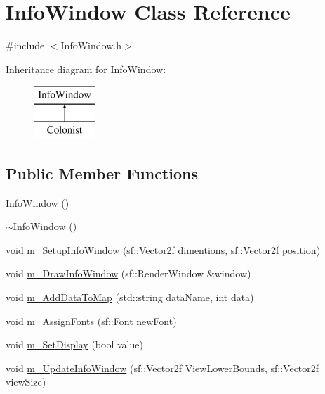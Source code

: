 \hypertarget{class_info_window}{}\section{Info\+Window Class Reference}
\label{class_info_window}


{\ttfamily \#include $<$Info\+Window.\+h$>$}

Inheritance diagram for Info\+Window\+:\begin{figure}[H]
\begin{center}
\leavevmode
\includegraphics[height=2.000000cm]{class_info_window}
\end{center}
\end{figure}
\subsection*{Public Member Functions}
\begin{DoxyCompactItemize}
\item 
\mbox{\hyperlink{class_info_window_a989cf8d93250fe17f944860b8efdd68d}{Info\+Window}} ()
\item 
\mbox{\hyperlink{class_info_window_a41a3465e5db7d3ac6fa9627ff20fa241}{$\sim$\+Info\+Window}} ()
\item 
void \mbox{\hyperlink{class_info_window_a32e95be032eae3d7954ec4cb149b6be5}{m\+\_\+\+Setup\+Info\+Window}} (sf\+::\+Vector2f dimentions, sf\+::\+Vector2f position)
\item 
void \mbox{\hyperlink{class_info_window_ae53368fe52e5d4d41cc157d3a8582744}{m\+\_\+\+Draw\+Info\+Window}} (sf\+::\+Render\+Window \&window)
\item 
void \mbox{\hyperlink{class_info_window_a1dc630a6d223bdc4bb672bd961f1622e}{m\+\_\+\+Add\+Data\+To\+Map}} (std\+::string data\+Name, int data)
\item 
void \mbox{\hyperlink{class_info_window_a5306b949858741146614d82ba39704d2}{m\+\_\+\+Assign\+Fonts}} (sf\+::\+Font new\+Font)
\item 
void \mbox{\hyperlink{class_info_window_a494f9cbe7a7c89a1073443fbc1a4437f}{m\+\_\+\+Set\+Display}} (bool value)
\item 
void \mbox{\hyperlink{class_info_window_a3b63c075f8c26f96d2569b163a7dfde9}{m\+\_\+\+Update\+Info\+Window}} (sf\+::\+Vector2f View\+Lower\+Bounds, sf\+::\+Vector2f view\+Size)
\end{DoxyCompactItemize}


